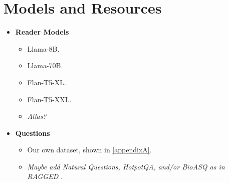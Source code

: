 \section{Models and Resources}
\label{models_and_resources}

\begin{itemize}
	\item \textbf{Reader Models}
		\begin{itemize}
			\item Llama-8B.
			\item Llama-70B.
			\item Flan-T5-XL.
			\item Flan-T5-XXL.
			\item \textsl{Atlas?}
		\end{itemize}
	\item \textbf{Questions}
		\begin{itemize}
			\item Our own dataset, shown in \cref{appendixA}.
			\item \textsl{Maybe add \textsf{Natural Questions}, \textsf{HotpotQA}, and/or \textsf{BioASQ} as in \textup{\textsf{RAGGED} \citep{ragged}}}.
		\end{itemize}
\end{itemize}
